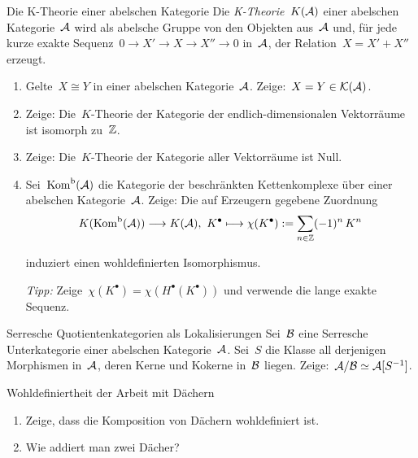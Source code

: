 \documentclass{uebblatt}
\begin{document}
\begin{aufgabe}{Die K-Theorie einer abelschen Kategorie}
Die \emph{K-Theorie}~$K(\mathcal{A})$ einer abelschen Kategorie~$\mathcal{A}$ wird als abelsche
Gruppe von den Objekten aus~$\mathcal{A}$ und, für jede kurze exakte
Sequenz~$0 \to X' \to X \to X'' \to 0$ in~$\mathcal{A}$, der Relation~$X = X' + X''$ erzeugt.

\begin{enumerate}
\item Gelte~$X \cong Y$ in einer abelschen Kategorie~$\mathcal{A}$. Zeige:~$X = Y \in \mathcal{K}(\mathcal{A})$.
\item Zeige: Die~$K$-Theorie der Kategorie der endlich-dimensionalen Vektorräume
ist isomorph zu~$\mathbb{Z}$.
\item Zeige: Die~$K$-Theorie der Kategorie aller Vektorräume ist Null.
\item Sei~$\mathrm{Kom}^\mathrm{b}(\mathcal{A})$ die Kategorie der beschränkten Kettenkomplexe über einer
abelschen Kategorie~$\mathcal{A}$. Zeige: Die auf Erzeugern gegebene Zuordnung
\[ K(\mathrm{Kom}^\mathrm{b}(\mathcal{A})) \longrightarrow K(\mathcal{A}),\ K^\bullet \longmapsto
  \chi(K^\bullet) := \sum_{n \in \mathbb{Z}} (-1)^n \, K^n \]
\vspace{-1.5em}

induziert einen wohldefinierten Isomorphismus.

\emph{Tipp:} Zeige~$\chi(K^\bullet) = \chi(H^\bullet(K^\bullet))$ und verwende
die lange exakte Sequenz.
\end{enumerate}
\end{aufgabe}

\begin{aufgabe}{Serresche Quotientenkategorien als Lokalisierungen}
Sei~$\mathcal{B}$ eine Serresche Unterkategorie einer abelschen Kategorie~$\mathcal{A}$. Sei~$S$
die Klasse all derjenigen Morphismen in~$\mathcal{A}$, deren Kerne und Kokerne in~$\mathcal{B}$
liegen. Zeige:~$\mathcal{A}/\mathcal{B} \simeq \mathcal{A}[S^{-1}]$.
\end{aufgabe}
\vspace{-1em}

\begin{aufgabe}{Wohldefiniertheit der Arbeit mit Dächern}
\begin{enumerate}
\item Zeige, dass die Komposition von Dächern wohldefiniert ist.
\item Wie addiert man zwei Dächer?
\end{enumerate}
\end{aufgabe}
\end{document}
